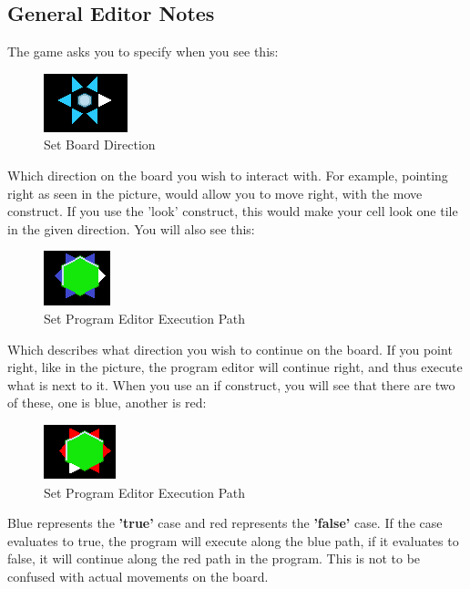 \documentclass[12pt]{article}
\begin{document}
\subsection{General Editor Notes}

The game asks you to specify when you see this:

\begin{figure}[h]
	\centering
		\includegraphics{img/SetDirection.png}
	\caption{Set Board Direction}
	\label{fig:SetDirection}
\end{figure}

Which direction on the board you wish to interact with. For example, pointing right as seen in the picture, would allow you to move right, with the move construct. If you use the 'look' construct, this would make your cell look one tile in the given direction. You will also see this:

\begin{figure}[h]
	\centering
		\includegraphics{img/Setprogramexecution.png}
	\caption{Set Program Editor Execution Path}
	\label{fig:Setprogramexecution}
\end{figure}

Which describes what direction you wish to continue on the board. If you point right, like in the picture, the program editor will continue right, and thus execute what is next to it. When you use an if construct, you will see that there are two of these, one is blue, another is red:


\begin{figure}[h]
	\centering
		\includegraphics{img/setprogramexecutionfalse.png}
	\caption{Set Program Editor Execution Path}
	\label{fig:setprogramexecutionfalse}
\end{figure}

Blue represents the \textbf{'true'} case and red represents the \textbf{'false'} case. If the case evaluates to true, the program will execute along the blue path, if it evaluates to false, it will continue along the red path in the program. This is not to be confused with actual movements on the board.
\end{document}

